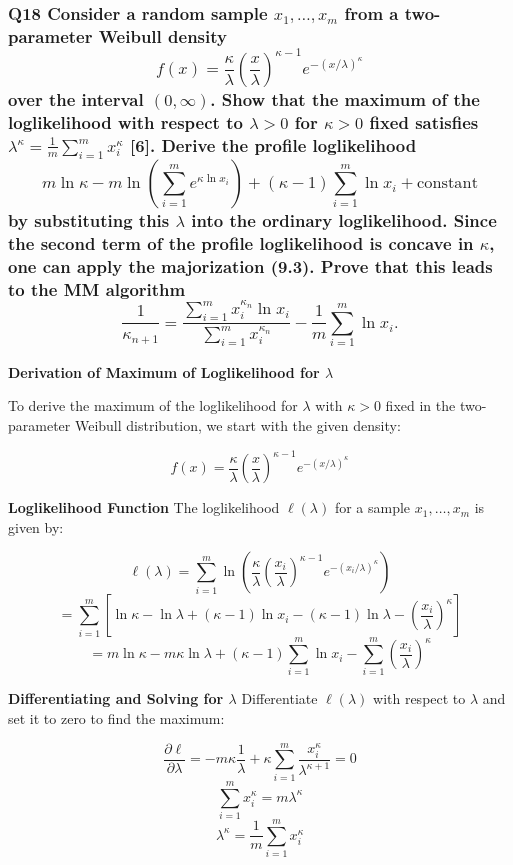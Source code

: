 \documentclass[8pt]{article}
\begin{document}
{\subsubsection*{Q18 Consider a random sample \( x_1, \ldots, x_m \) from a two-parameter Weibull density
\[
f(x) = \frac{\kappa}{\lambda} \left( \frac{x}{\lambda} \right)^{\kappa - 1} e^{-(x / \lambda)^\kappa}
\]
over the interval \((0, \infty)\). Show that the maximum of the loglikelihood with respect to \(\lambda > 0\) for \(\kappa > 0\) fixed satisfies \(\lambda^\kappa = \frac{1}{m} \sum_{i=1}^m x_i^\kappa\) [6]. Derive the profile loglikelihood
\[
m \ln \kappa - m \ln \left( \sum_{i=1}^m e^{\kappa \ln x_i} \right) + (\kappa - 1) \sum_{i=1}^m \ln x_i + \text{constant}
\]
by substituting this \(\lambda\) into the ordinary loglikelihood. Since the second term of the profile loglikelihood is concave in \(\kappa\), one can apply the majorization (9.3). Prove that this leads to the MM algorithm
\[
\frac{1}{\kappa_{n+1}} = \frac{\sum_{i=1}^m x_i^{\kappa_n} \ln x_i}{\sum_{i=1}^m x_i^{\kappa_n}} - \frac{1}{m} \sum_{i=1}^m \ln x_i.
\]}

\textbf{Derivation of Maximum of Loglikelihood for \(\lambda\)}

To derive the maximum of the loglikelihood for \(\lambda\) with \(\kappa > 0\) fixed in the two-parameter Weibull distribution, we start with the given density:

\[
f(x) = \frac{\kappa}{\lambda} \left( \frac{x}{\lambda} \right)^{\kappa - 1} e^{-(x / \lambda)^\kappa}
\]

\textbf{Loglikelihood Function}
The loglikelihood \(\ell(\lambda)\) for a sample \(x_1, \ldots, x_m\) is given by:

\[
\ell(\lambda) = \sum_{i=1}^m \ln \left( \frac{\kappa}{\lambda} \left( \frac{x_i}{\lambda} \right)^{\kappa - 1} e^{-(x_i / \lambda)^\kappa} \right)
\]
\[
= \sum_{i=1}^m \left[ \ln \kappa - \ln \lambda + (\kappa - 1) \ln x_i - (\kappa - 1) \ln \lambda - \left(\frac{x_i}{\lambda}\right)^\kappa \right]
\]
\[
= m \ln \kappa - m \kappa \ln \lambda + (\kappa - 1) \sum_{i=1}^m \ln x_i - \sum_{i=1}^m \left(\frac{x_i}{\lambda}\right)^\kappa
\]

\textbf{Differentiating and Solving for \(\lambda\)}
Differentiate \(\ell(\lambda)\) with respect to \(\lambda\) and set it to zero to find the maximum:

\[
\frac{\partial \ell}{\partial \lambda} = -m \kappa \frac{1}{\lambda} + \kappa \sum_{i=1}^m \frac{x_i^\kappa}{\lambda^{\kappa + 1}} = 0
\]
\[
\sum_{i=1}^m x_i^\kappa = m \lambda^\kappa
\]
\[
\lambda^\kappa = \frac{1}{m} \sum_{i=1}^m x_i^\kappa
\]

}
\end{document}
